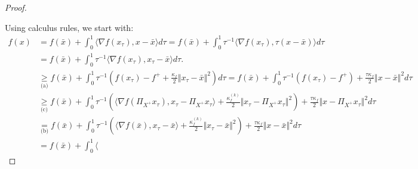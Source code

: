 \documentclass[12pt]{report}
\begin{document}
\begin{proof}
\begin{enumerate}
                \end{enumerate}
                Using calculus rules, we start with: 
                {\footnotesize
                \begin{align*}
                    f(x) &= 
                    f(\bar x) + \int_0^1 \langle \nabla f(x_\tau), x - \bar x\rangle d\tau
                    = 
                    f(\bar x) + \int_0^1 \tau^{-1}\langle \nabla f(x_\tau), \tau(x - \bar x)\rangle d\tau
                    \\
                    &= 
                    f(\bar x) + \int_0^1 \tau^{-1}\langle \nabla f(x_\tau), x_\tau - \bar x\rangle d\tau.
                    \\
                    &\underset{\text{(a)}}{\ge }
                    f(\bar x) + 
                    \int_0^1 \tau^{-1} \left(
                        f(x_\tau) - f^+ + \frac{\kappa_f}{2}\Vert x_\tau - \bar x\Vert^2
                    \right) d\tau
                    = 
                    f(\bar x) + 
                    \int_0^1 
                    \tau^{-1} \left(
                            f(x_\tau) - f^+ 
                        \right)
                        + \frac{\tau\kappa_f}{2}\Vert x - \bar x\Vert^2
                    d\tau
                    \\
                    &\underset{\text{(c)}}{\ge }
                    f(\bar x) + 
                    \int_0^1 
                    \tau^{-1} \left(
                            \langle 
                                \nabla f(\Pi_{X^+}x_\tau), x_\tau - \Pi_{X^+}x_\tau
                            \rangle
                            + \frac{\kappa_f^{(k)}}{2} \Vert x_\tau - \Pi_{X^+}x_\tau\Vert^2
                        \right)
                        + \frac{\tau\kappa_f}{2}\Vert x - \Pi_{X^+}x_\tau\Vert^2
                    d\tau
                    \\
                    &\underset{\text{(b)}}{=} 
                    f(\bar x) + 
                    \int_0^1 
                    \tau^{-1} \left(
                            \langle 
                                \nabla f(\bar x), x_\tau - \bar x
                            \rangle
                            + \frac{\kappa_f^{(k)}}{2} \Vert x_\tau - \bar x\Vert^2
                        \right)
                        + \frac{\tau\kappa_f}{2}\Vert x - \bar x\Vert^2
                    d\tau
                    \\
                    &= 
                    f(\bar x) + 
                    \int_0^1 
                        \langle 

\end{align*}}
\end{proof}
\end{document}
